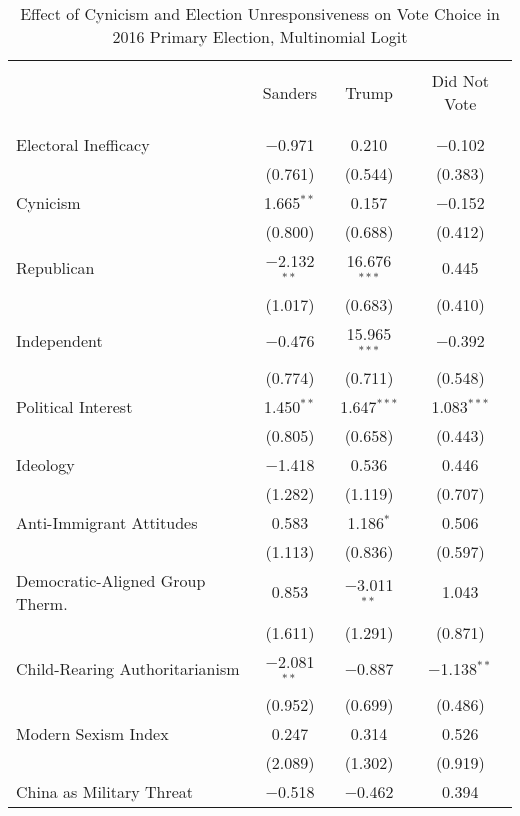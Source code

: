 \documentclass[12pt]{article}
\begin{document}
\begin{appendices}
\begin{refsection}
\begin{table}[!t] \centering 
  \caption{Effect of Cynicism and Election Unresponsiveness on Vote Choice in 2016 Primary Election, Multinomial Logit} 
  \label{tab:primary} 
   \renewcommand{\arraystretch}{1}
\begin{adjustbox}{width=0.6\textwidth,center}
\begin{tabular}{@{\extracolsep{5pt}}lccc} 
\\[-1.8ex]\hline 
 \\[-2ex] 
 & Sanders & Trump & Did Not Vote \\ 
\hline \\[-1.8ex] 
\hline \\[-1.8ex] 
 Electoral Inefficacy & $-$0.971 & 0.210 & $-$0.102 \\ 
  & (0.761) & (0.544) & (0.383) \\ 
 Cynicism & 1.665$^{**}$ & 0.157 & $-$0.152 \\ 
  & (0.800) & (0.688) & (0.412) \\ 
 Republican & $-$2.132$^{**}$ & 16.676$^{***}$ & 0.445 \\ 
  & (1.017) & (0.683) & (0.410) \\ 
 Independent & $-$0.476 & 15.965$^{***}$ & $-$0.392 \\ 
  & (0.774) & (0.711) & (0.548) \\ 
 Political Interest & 1.450$^{**}$ & 1.647$^{***}$ & 1.083$^{***}$ \\ 
  & (0.805) & (0.658) & (0.443) \\ 
 Ideology & $-$1.418 & 0.536 & 0.446 \\ 
  & (1.282) & (1.119) & (0.707) \\ 
 Anti-Immigrant Attitudes & 0.583 & 1.186$^{*}$ & 0.506 \\ 
  & (1.113) & (0.836) & (0.597) \\ 
 Democratic-Aligned Group Therm. & 0.853 & $-$3.011$^{**}$ & 1.043 \\ 
  & (1.611) & (1.291) & (0.871) \\ 
 Child-Rearing Authoritarianism & $-$2.081$^{**}$ & $-$0.887 & $-$1.138$^{**}$ \\ 
  & (0.952) & (0.699) & (0.486) \\ 
 Modern Sexism Index & 0.247 & 0.314 & 0.526 \\ 
  & (2.089) & (1.302) & (0.919) \\ 
 China as Military Threat & $-$0.518 & $-$0.462 & 0.394 \\ 

\end{tabular}
\end{adjustbox}
\end{table}
\end{refsection}
\end{appendices}
\end{document}
